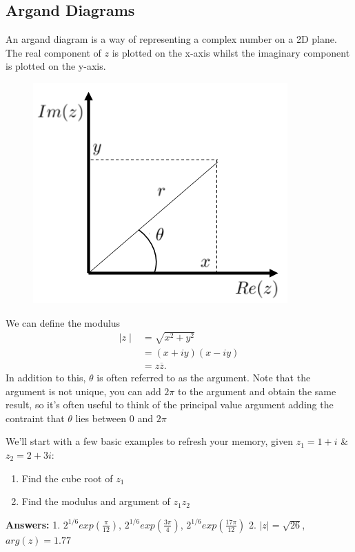 \subsection{Argand Diagrams}
An argand diagram is a way of representing a complex number on a 2D plane.
 The real component of $z$ is plotted on the x-axis whilst the imaginary component is plotted on the y-axis.
 \begin{minipage}[t]{0.47\linewidth}
 	\begin{figure}[H]
 		\centering
 		\includegraphics[width=\linewidth]{complex/argand}
 		\captionsetup{font=small} 	
 	\end{figure} 
 \end{minipage}
 \hspace{0.6cm}
%
\begin{minipage}[t]{0.47\linewidth}
	\vspace{1cm}
	We can define the modulus 
	\begin{align*}
	\mid z \mid &= \sqrt{x^2+y^2} \\
	&= (x+iy)(x-iy) \\
	&= z\overline{z}.
	\end{align*}
	In addition to this, $\theta$ is often referred to as the argument.
	 Note that the argument is not unique, you can add $2\pi$ to the argument and obtain the same result, so it's often useful to think of the principal value argument adding the contraint that $\theta$ lies between $0$ and $2\pi$
\end{minipage}
\begin{examples}
	We'll start with a few basic examples to refresh your memory, given $z_1=1+i$ \& $z_2=2+3i$:
	\begin{enumerate}
		\item Find the cube root of $z_1$
		\item Find the modulus and argument of $z_1z_2$
	\end{enumerate}
\textbf{Answers:} 1. $2^{1/6}exp(\frac{\pi}{12})$, $2^{1/6}exp(\frac{3\pi}{4})$, $2^{1/6}exp(\frac{17\pi}{12})$ \hspace{0.5cm}
2. $\mid z\mid = \sqrt{26}$, $arg(z)=1.77$
\end{examples}
